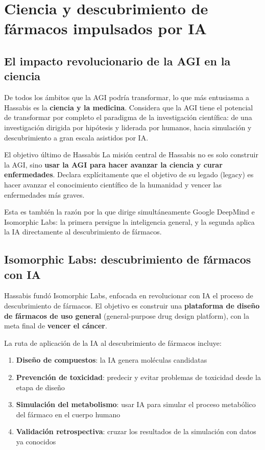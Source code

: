 \section{Ciencia y descubrimiento de fármacos impulsados por IA}

\subsection{El impacto revolucionario de la AGI en la ciencia}

De todos los ámbitos que la AGI podría transformar, lo que más entusiasma a Hassabis es la \textbf{ciencia y la medicina}. Considera que la AGI tiene el potencial de transformar por completo el paradigma de la investigación científica: de una investigación dirigida por hipótesis y liderada por humanos, hacia simulación y descubrimiento a gran escala asistidos por IA.

\begin{importantbox}{El objetivo último de Hassabis}
La misión central de Hassabis no es solo construir la AGI, sino \textbf{usar la AGI para hacer avanzar la ciencia y curar enfermedades}. Declara explícitamente que el objetivo de su legado (legacy) es hacer avanzar el conocimiento científico de la humanidad y vencer las enfermedades más graves.

Esta es también la razón por la que dirige simultáneamente Google DeepMind e Isomorphic Labs: la primera persigue la inteligencia general, y la segunda aplica la IA directamente al descubrimiento de fármacos.
\end{importantbox}

\subsection{Isomorphic Labs: descubrimiento de fármacos con IA}

Hassabis fundó Isomorphic Labs, enfocada en revolucionar con IA el proceso de descubrimiento de fármacos. El objetivo es construir una \textbf{plataforma de diseño de fármacos de uso general} (general-purpose drug design platform), con la meta final de \textbf{vencer el cáncer}.

La ruta de aplicación de la IA al descubrimiento de fármacos incluye:
\begin{enumerate}
    \item \textbf{Diseño de compuestos}: la IA genera moléculas candidatas
    \item \textbf{Prevención de toxicidad}: predecir y evitar problemas de toxicidad desde la etapa de diseño
    \item \textbf{Simulación del metabolismo}: usar IA para simular el proceso metabólico del fármaco en el cuerpo humano
    \item \textbf{Validación retrospectiva}: cruzar los resultados de la simulación con datos ya conocidos
\end{enumerate}

